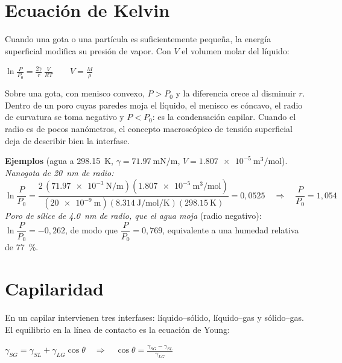 \documentclass[10pt,letterpaper]{article}
\begin{document}
\section{Ecuación de Kelvin}
Cuando una gota o una partícula es suficientemente pequeña, la energía superficial modifica su presión de vapor. Con $V$ el volumen molar del líquido:
\begin{clave}
$\displaystyle \ln\frac{P}{P_0}=\frac{2\gamma}{r}\,\frac{V}{RT}\qquad V=\frac{M}{\rho}$
\end{clave}
Sobre una gota, con menisco convexo, $P>P_0$ y la diferencia crece al disminuir $r$. Dentro de un poro cuyas paredes moja el líquido, el menisco es cóncavo, el radio de curvatura se toma negativo y $P<P_0$: es la condensación capilar. Cuando el radio es de pocos nanómetros, el concepto macroscópico de tensión superficial deja de describir bien la interfase.
\begin{apoyo}\small\textbf{Ejemplos} (agua a \SI{298,15}{\kelvin}, $\gamma=\SI{71,97}{\milli\newton\per\meter}$, $V=\SI{1,807e-5}{\meter\cubed\per\mole}$).\\[3pt]
\textit{Nanogota de \SI{20}{\nano\meter} de radio:}
\[\ln\frac{P}{P_0}=\frac{2\,(\SI{71,97e-3}{\newton\per\meter})(\SI{1,807e-5}{\meter\cubed\per\mole})}{(\SI{20e-9}{\meter})(\SI{8,314}{\joule\per\mole\per\kelvin})(\SI{298,15}{\kelvin})}=0{,}0525\quad\Rightarrow\quad\frac{P}{P_0}=1{,}054\]
\textit{Poro de sílice de \SI{4,0}{\nano\meter} de radio, que el agua moja} (radio negativo): $\ln\dfrac{P}{P_0}=-0{,}262$, de modo que $\dfrac{P}{P_0}=0{,}769$, equivalente a una humedad relativa de \SI{77}{\percent}.
\end{apoyo}

\section{Capilaridad}
En un capilar intervienen tres interfases: líquido--sólido, líquido--gas y sólido--gas. El equilibrio en la línea de contacto es la ecuación de Young:
\begin{clave}
$\displaystyle\gamma_{SG}=\gamma_{SL}+\gamma_{LG}\cos\theta\quad\Rightarrow\quad\cos\theta=\frac{\gamma_{SG}-\gamma_{SL}}{\gamma_{LG}}$
\end{clave}
\end{document}
